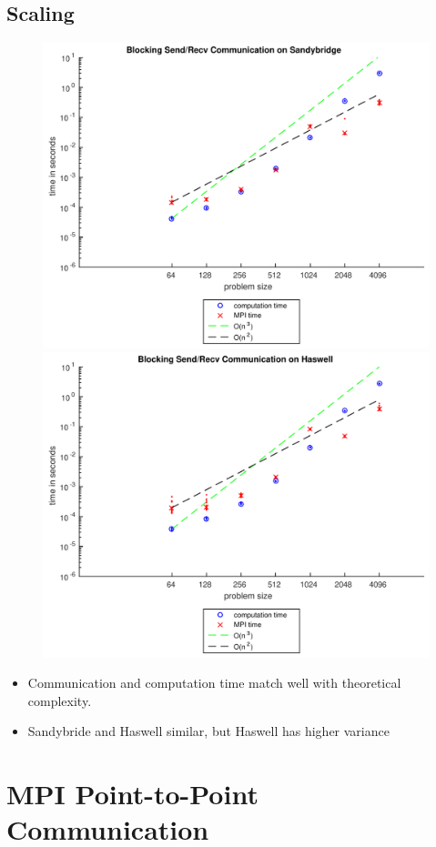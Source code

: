 \documentclass[9pt,pdftex]{beamer}
\begin{document}
\subsection{Scaling}
\begin{frame}{\insertsubsection}
\begin{figure}
\includegraphics[width=.5\textwidth]{Pictures/Task3SB}
\hfill
\includegraphics[width=.5\textwidth]{Pictures/Task3HW}
\end{figure}
\begin{itemize}
\item Communication and computation time match well with theoretical complexity.
\item Sandybride and Haswell similar, but Haswell has higher variance
\end{itemize}
\end{frame}

\section{MPI Point-to-Point Communication}
\begin{frame}{\phantom{Contents}}
\tableofcontents[
  currentsection  
]
\end{frame}
\end{document}
